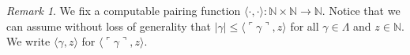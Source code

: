 \documentclass[11pt]{amsart}
\theoremstyle{definition}
\theoremstyle{remark}
\newtheorem{remark}[thm]{Remark}
\theoremstyle{plain}
\def\la{\langle}
\def\ra{\rangle}
\newcommand{\numberset}{\mathbb}
\newcommand{\N}{\numberset{N}}
\def\g{\gamma}
\newcommand{\gd}[1]{{\ulcorner{#1}\urcorner}}
\def\N{{\mathbb{N}}}
\newcommand{\andrea}[1]{\textcolor{green}{#1}}
\begin{document}


\begin{remark}\label{pairingfunctionproperty}
We fix a computable pairing function $\langle \cdot, \cdot\rangle : \N\times \N\to \N$. 
Notice that we can assume without loss of generality that $|\gamma| \le \la \gd\g,z \ra$ for all $\gamma \in \Lambda$ and $z\in\N$. 
We write $\langle \g, z\rangle$ for $\langle \gd\g, z\rangle$.
\end{remark}
\end{document}
